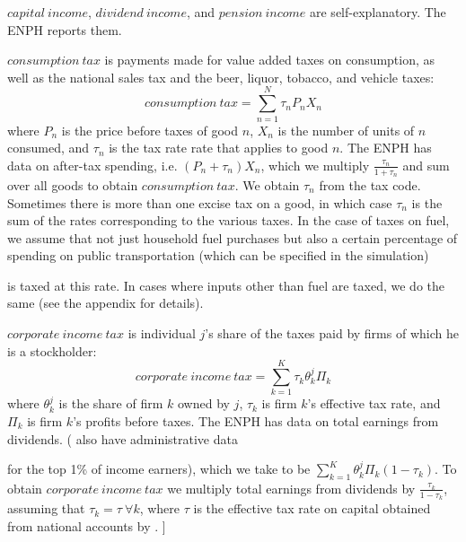 \documentclass[12pt]{article}
\begin{document}
$capital\ income$, $dividend\ income$, and $pension\ income$
are self-explanatory. The ENPH reports them.

\iffalse
[[ AN ECONOMIST:
    What about payroll income? I (Jeff) wouldn't call that self-explanatory.

    AN ECONOMIST:
    Should $corporate\ income\ tax$, described below, be in the numerator
    in the definition of $t_j$?
    --jbb

    JEFF:
    BLOCKED -- might be addressed once I've renamed taxes and consumptions.
\fi

$consumption\ tax$
is payments made for value added taxes on consumption,
as well as the national sales tax
and the beer, liquor, tobacco, and vehicle taxes:
\begin{equation}
consumption\ tax = \sum^{N}_{n=1} \tau_nP_nX_n
\end{equation}
where $P_n$ is the price before taxes of good $n$,
$X_n$ is the number of units of $n$ consumed,
and $\tau_n$ is the tax rate rate that applies to good $n$.
The ENPH has data on after-tax spending,
i.e. $(P_n+\tau_n)X_n$,
which we multiply $\frac{\tau_n}{1+\tau_n}$
and sum over all goods to obtain $consumption\ tax$.
We obtain $\tau_n$ from the tax code.
Sometimes there is more than one excise tax on a good,
in which case $\tau_n$ is the sum of
the rates corresponding to the various taxes.
In the case of taxes on fuel,
we assume that not just household fuel purchases but also
a certain percentage of spending on public transportation
(which can be specified in the simulation)
\iffalse
[[ LUIS:
    I don't think it can, actually.
    Did we promise that before writing the microsimulation,
    or am I forgetting something?
    --jbb]]
\fi
is taxed at this rate.
In cases where inputs other than fuel are taxed, we do the same
(see the appendix for details).

$corporate\ income\ tax$ is individual $j$'s share of
the taxes paid by firms of which he is a stockholder:
\begin{equation}
  corporate\ income\ tax = \sum^{K}_{k=1} \tau_k\theta^j_k\Pi_k
\end{equation}
where $\theta^j_k$ is the share of firm $k$ owned by $j$,
$\tau_k$ is firm $k$'s effective tax rate,
and $\Pi_k$ is firm $k$'s profits before taxes.
The ENPH has data on total earnings from dividends.
(\citet{juliana} also have administrative data
\iffalse
    [[ AN ECONOMIST:
        Who is juliana? That string only appears cited in this document,
        but the citation is never defined. --jbb]]
\fi
for the top 1\% of income earners),
which we take to be $\sum^{K}_{k=1} \theta^j_k\Pi_k(1-\tau_k)$.
To obtain $corporate\ income\ tax$
we multiply total earnings from dividends by
$\frac{\tau_k}{1-\tau_k}$,
assuming that $\tau_k=\tau\  \forall k$,
where $\tau$ is the effective tax rate on capital
obtained from national accounts by \citet{banrep}.
\iffalse
[[ AN ECONOMIST:
    I'm unaware of any place in the code that does this,
    and pretty sure that's because there isn't one.
    Maybe Luis Carlos Reyes or David Suarez was computing it by hand.
    --jbb]]
\end{document}
